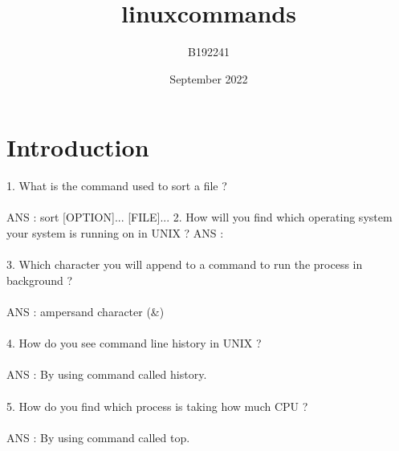 \documentclass{article}
\title{linuxcommands}
\author{B192241 }
\date{September 2022}
\begin{document}
\maketitle

\section{Introduction}
1. What is the command used to sort a file ? \\ \\
ANS : sort [OPTION]... [FILE]...
2. How will you find which operating system your system is running on in UNIX ?
ANS : \\ \\
3. Which character you will append to a command to run the process in background ? \\ \\
ANS : ampersand character (\&) 
\\ \\
4. How do you see command line history in UNIX ? \\ \\
ANS : By using command called history. \\ \\
5. How do you find which process is taking how much CPU ? \\ \\
ANS : By using command called top.
\end{document}
